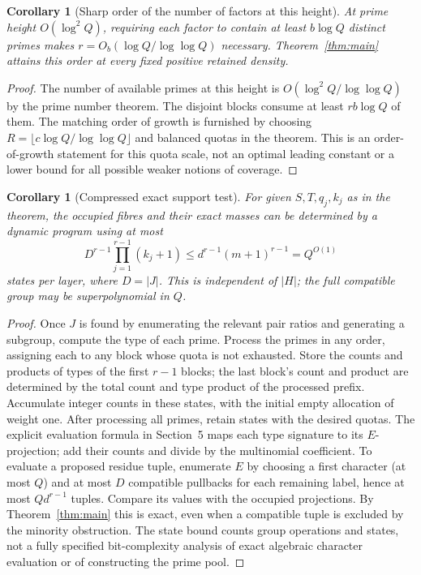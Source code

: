 \documentclass[11pt]{article}
\newtheorem{corollary}[theorem]{Corollary}
\theoremstyle{remark}\newtheorem{remark}[theorem]{Remark}
\begin{document}
\begin{corollary}[Sharp order of the number of factors at this height]\label{cor:order}
At prime height $O(\log^2Q)$, requiring each factor to contain at least $b\log Q$ distinct primes makes $r=O_b(\log Q/\log\log Q)$ necessary. Theorem~\ref{thm:main} attains this order at every fixed positive retained density.
\end{corollary}
\begin{proof}
The number of available primes at this height is $O(\log^2Q/\log\log Q)$ by the prime number theorem. The disjoint blocks consume at least $rb\log Q$ of them. The matching order of growth is furnished by choosing $R=\lfloor c\log Q/\log\log Q\rfloor$ and balanced quotas in the theorem. This is an order-of-growth statement for this quota scale, not an optimal leading constant or a lower bound for all possible weaker notions of coverage.
\end{proof}

\begin{corollary}[Compressed exact support test]\label{cor:algorithm}
For given $S,T,q_j,k_j$ as in the theorem, the occupied fibres and their exact masses can be determined by a dynamic program using at most
\[
D^{r-1}\prod_{j=1}^{r-1}(k_j+1)\le d^{r-1}(m+1)^{r-1}=Q^{O(1)}
\]
 states per layer, where $D=|J|$. This is independent of $|H|$; the full compatible group may be superpolynomial in $Q$.
\end{corollary}
\begin{proof}
Once $J$ is found by enumerating the relevant pair ratios and generating a subgroup, compute the type of each prime. Process the primes in any order, assigning each to any block whose quota is not exhausted. Store the counts and products of types of the first $r-1$ blocks; the last block's count and product are determined by the total count and type product of the processed prefix. Accumulate integer counts in these states, with the initial empty allocation of weight one. After processing all primes, retain states with the desired quotas. The explicit evaluation formula in Section~5 maps each type signature to its $E$-projection; add their counts and divide by the multinomial coefficient. To evaluate a proposed residue tuple, enumerate $E$ by choosing a first character (at most $Q$) and at most $D$ compatible pullbacks for each remaining label, hence at most $Qd^{r-1}$ tuples. Compare its values with the occupied projections. By Theorem~\ref{thm:main} this is exact, even when a compatible tuple is excluded by the minority obstruction. The state bound counts group operations and states, not a fully specified bit-complexity analysis of exact algebraic character evaluation or of constructing the prime pool.
\end{proof}
\end{document}
